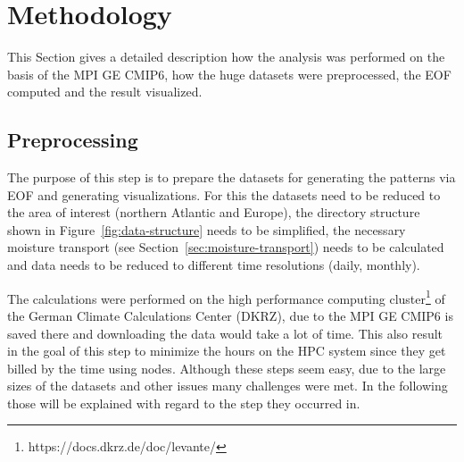 \chapter{Methodology}
\label{ch:methodology}


%
This Section gives a detailed description how the analysis was performed on the basis of the MPI GE CMIP6, how the huge datasets were preprocessed, the EOF computed and the result visualized. 

\section{Preprocessing}
\label{sec:preprocessing}

The purpose of this step is to prepare the datasets for generating the patterns via EOF and generating visualizations. For this the datasets need to be reduced to the area of interest (northern Atlantic and Europe), the directory structure shown in Figure~\ref{fig:data-structure} needs to be simplified, the necessary moisture transport (see Section~\ref{sec:moisture-transport}) needs to be calculated and data needs to be reduced to different time resolutions (daily, monthly). 

The calculations were performed on the high performance computing cluster\footnote{https://docs.dkrz.de/doc/levante/} of the German Climate Calculations Center (DKRZ), due to the MPI GE CMIP6 is saved there and downloading the data would take a lot of time. 
This also result in the goal of this step to minimize the hours on the HPC system since they get billed by the time using nodes. 
Although these steps seem easy, due to the large sizes of the datasets and other issues many challenges were met. 
In the following those will be explained with regard to the step they occurred in. 



